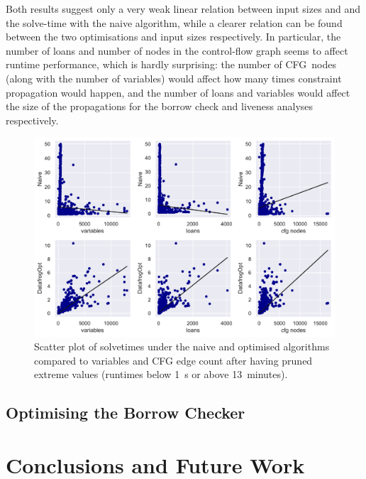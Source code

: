 \documentclass[11pt,a4paper,twoside,openany]{report}
\newcommand{\fixme}[1] {{\color{red}#1}}
\begin{document}
Both results suggest only a very weak linear relation between input sizes and
and the solve-time with the naive algorithm, while a clearer relation can be
found between the two optimisations and input sizes respectively. In particular,
the number of loans and number of nodes in the control-flow graph seems to
affect runtime performance, which is hardly surprising: the number of CFG~nodes
(along with the number of variables) would affect how many times constraint
propagation would happen, and the number of loans and variables would affect the
size of the propagations for the borrow check and liveness analyses
respectively.

\begin{figure}
  \includegraphics[width=0.9\linewidth]{Graphs/corr_scatter.pdf}
  \caption{Scatter plot of solvetimes under the naive and optimised algorithms
    compared to variables and CFG edge count after having pruned extreme values
    (runtimes below 1~s or above 13~minutes).}
  \label{fig:input-scatter}
\end{figure}


\section{Optimising the Borrow Checker}\label{sec:optim-borr-check}



\chapter{Conclusions and Future Work}\label{cha:conclusions}


\printbibliography[heading=bibintoc]
\end{document}
